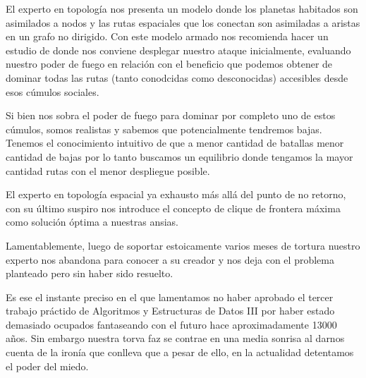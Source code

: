 El experto en topolog\'ia nos presenta un modelo donde los planetas 
habitados son asimilados a nodos y las rutas espaciales que los conectan
son asimiladas a aristas en un grafo no dirigido. Con este modelo
armado nos recomienda hacer un estudio de donde nos conviene 
desplegar nuestro ataque inicialmente, evaluando nuestro poder de
fuego en relaci\'on con el beneficio que podemos obtener de 
dominar todas las rutas (tanto conodcidas como desconocidas) 
accesibles desde esos c\'umulos sociales.

Si bien nos sobra el poder de fuego para dominar por completo 
uno de estos c\'umulos, somos realistas y sabemos que potencialmente
tendremos bajas. Tenemos el conocimiento intuitivo de que a menor
cantidad de batallas menor cantidad de bajas por lo tanto buscamos
un equilibrio donde tengamos la mayor cantidad rutas con el menor
despliegue posible.

El experto en topolog\'ia espacial ya exhausto m\'as all\'a del punto
de no retorno, con su \'ultimo suspiro nos introduce el concepto de 
clique de frontera m\'axima como soluci\'on \'optima a nuestras ansias.

Lamentablemente, luego de soportar estoicamente varios meses de tortura
nuestro experto nos abandona para conocer a su creador y nos deja con el 
problema planteado pero sin haber sido resuelto.

Es ese el instante preciso en el que lamentamos no haber aprobado el 
tercer trabajo pr\'actido de Algoritmos y Estructuras de Datos III 
por haber estado demasiado ocupados fantaseando con el futuro hace
aproximadamente 13000 a\~nos. Sin embargo nuestra torva faz se contrae
en una media sonrisa al darnos cuenta de la iron\'ia que conlleva que 
a pesar de ello, en la actualidad detentamos el poder del miedo.
